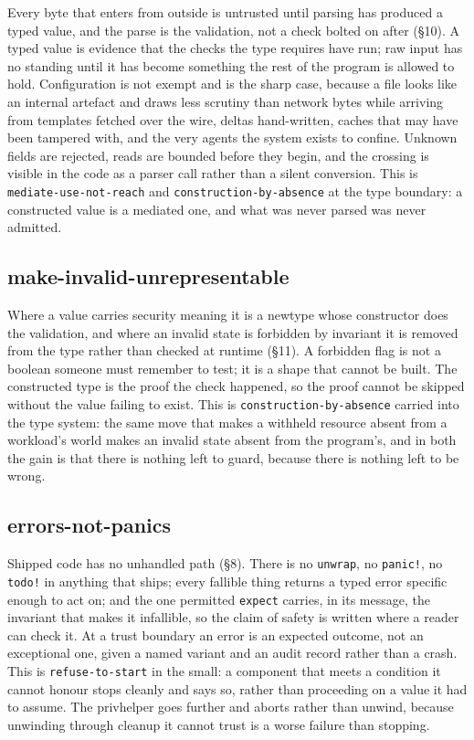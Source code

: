 Every byte that enters from outside is untrusted until parsing has
produced a typed value, and the parse is the validation, not a check
bolted on after (§10). A typed value is evidence that the checks the
type requires have run; raw input has no standing until it has become
something the rest of the program is allowed to hold. Configuration is
not exempt and is the sharp case, because a file looks like an internal
artefact and draws less scrutiny than network bytes while arriving from
templates fetched over the wire, deltas hand-written, caches that may
have been tampered with, and the very agents the system exists to
confine. Unknown fields are rejected, reads are bounded before they
begin, and the crossing is visible in the code as a parser call rather
than a silent conversion. This is \texttt{mediate-use-not-reach} and
\texttt{construction-by-absence} at the type boundary: a constructed
value is a mediated one, and what was never parsed was never admitted.

\hypertarget{make-invalid-unrepresentable}{%
\subsection{make-invalid-unrepresentable}\label{make-invalid-unrepresentable}}

Where a value carries security meaning it is a newtype whose constructor
does the validation, and where an invalid state is forbidden by
invariant it is removed from the type rather than checked at runtime
(§11). A forbidden flag is not a boolean someone must remember to test;
it is a shape that cannot be built. The constructed type is the proof
the check happened, so the proof cannot be skipped without the value
failing to exist. This is \texttt{construction-by-absence} carried into
the type system: the same move that makes a withheld resource absent
from a workload's world makes an invalid state absent from the
program's, and in both the gain is that there is nothing left to guard,
because there is nothing left to be wrong.

\hypertarget{errors-not-panics}{%
\subsection{errors-not-panics}\label{errors-not-panics}}

Shipped code has no unhandled path (§8). There is no \texttt{unwrap}, no
\texttt{panic!}, no \texttt{todo!} in anything that ships; every
fallible thing returns a typed error specific enough to act on; and the
one permitted \texttt{expect} carries, in its message, the invariant
that makes it infallible, so the claim of safety is written where a
reader can check it. At a trust boundary an error is an expected
outcome, not an exceptional one, given a named variant and an audit
record rather than a crash. This is \texttt{refuse-to-start} in the
small: a component that meets a condition it cannot honour stops cleanly
and says so, rather than proceeding on a value it had to assume. The
privhelper goes further and aborts rather than unwind, because unwinding
through cleanup it cannot trust is a worse failure than stopping.

